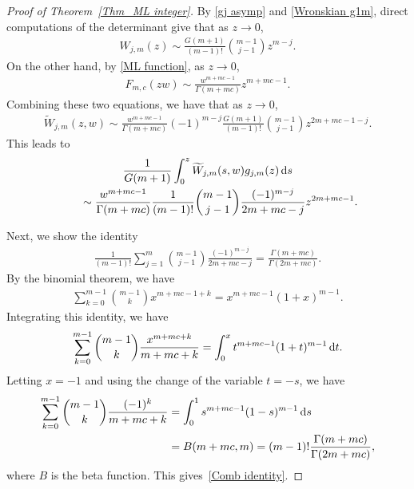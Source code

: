 \begin{proof}[Proof of Theorem~\ref{Thm_ML integer}]
	By \eqref{gj asymp} and \eqref{Wronskian g1m}, direct computations of the determinant give that as $z \to 0$,
	\begin{gather*}
	W_{j,m}(z) \sim \frac{G(m+1)}{(m-1)!} \binom{m-1}{j-1} z^{m-j}.
	\end{gather*}
	On the other hand, by \eqref{ML function}, as $z \to 0$,
	\begin{gather*}
	F_{m,c}(zw) \sim \frac{w^{m+mc-1}}{\Gamma(m+mc)} z^{m+mc-1}.
	\end{gather*}
	Combining these two equations, we have that as $z\to 0$,
	\begin{gather*}
	\widetilde{W}_{j,m}(z,w) \sim \frac{w^{m+mc-1}}{\Gamma(m+mc)} (-1)^{m-j} \frac{G(m+1)}{(m-1)!} \binom{m-1}{j-1} z^{2m+mc-1-j}.
	\end{gather*}
	This leads to
	\begin{gather*}
	\frac{1}{G(m+1)}\int_0^z \widetilde{W}_{j,m}(s,w) g_{j,m}(z)\,{\rm d}s\\
\qquad{} \sim \frac{w^{m+mc-1}}{\Gamma(m+mc)} \frac{1}{(m-1)!} \binom{m-1}{j-1} \frac{(-1)^{m-j} }{2m+mc-j} z^{2m+mc-1}.
	\end{gather*}
	
	Next, we show the identity
	\begin{gather}\label{Comb identity}
		\frac{1}{(m-1)!} \sum_{j=1}^{m} \binom{m-1}{j-1} \frac{(-1)^{m-j} }{2m+mc-j} = \frac{\Gamma(m+mc)}{\Gamma(2m+mc)}.
	\end{gather}
	By the binomial theorem, we have
	\begin{gather*}
	\sum_{k=0}^{m-1} \binom{m-1}{k} x^{m+mc-1+k} = x^{m+mc-1}(1+x)^{m-1}.
	\end{gather*}
	Integrating this identity, we have
	\begin{gather*}
	\sum_{k=0}^{m-1} \binom{m-1}{k} \frac{x^{m+mc+k}}{m+mc+k} = \int_0^x t^{m+mc-1}(1+t)^{m-1}\,{\rm d}t.
	\end{gather*}
	Letting $x=-1$ and using the change of the variable $t=-s$, we have
	\begin{align*}
		\sum_{k=0}^{m-1} \binom{m-1}{k} \frac{(-1)^{k}}{m+mc+k} &= \int_0^1 s^{m+mc-1}(1-s)^{m-1}\,{\rm d}s
		\\
		&=B(m+mc,m)=(m-1)! \frac{\Gamma(m+mc)}{\Gamma(2m+mc)},
	\end{align*}
	where $B$ is the beta function. This gives~\eqref{Comb identity}.
	

\end{proof}
